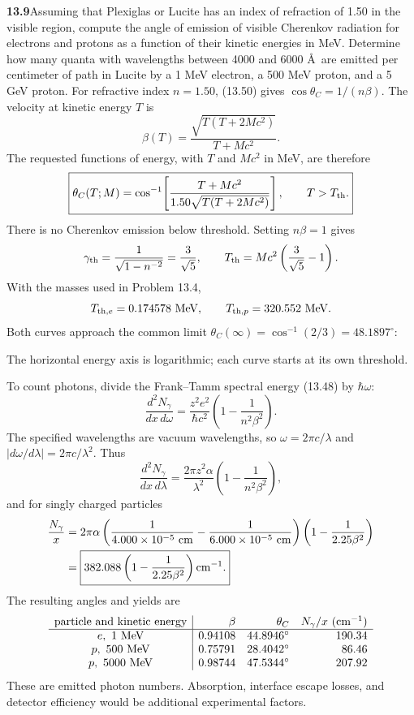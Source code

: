 \par\bigskip
\noindent\textbf{13.9}\quad Assuming that Plexiglas or Lucite has an index of refraction of 1.50 in the visible region, compute the angle of emission of visible Cherenkov radiation for electrons and protons as a function of their kinetic energies in MeV. Determine how many quanta with wavelengths between 4000 and 6000 \AA\ are emitted per centimeter of path in Lucite by a 1 MeV electron, a 500 MeV proton, and a 5 GeV proton.
\solution
For refractive index $n=1.50$, (13.50) gives
$\cos\theta_C=1/(n\beta)$. The velocity at kinetic energy $T$ is
\[
 \beta(T)=\frac{\sqrt{T(T+2Mc^2)}}{T+Mc^2}.
\]
The requested functions of energy, with $T$ and $Mc^2$ in MeV, are
therefore
\[
 \boxed{\theta_C(T;M)=
 \cos^{-1}\!\left[
 \frac{T+Mc^2}{1.50\sqrt{T(T+2Mc^2)}}\right],\qquad T>T_{\rm th}.}
\]
There is no Cherenkov emission below threshold. Setting $n\beta=1$
gives
\[
 \gamma_{\rm th}=\frac1{\sqrt{1-n^{-2}}}=\frac3{\sqrt5},
 \qquad
 T_{\rm th}=Mc^2\left(\frac3{\sqrt5}-1\right).
\]
With the masses used in Problem 13.4,
\[
 T_{{\rm th},e}=0.174578\ {\rm MeV},\qquad
 T_{{\rm th},p}=320.552\ {\rm MeV}.
\]
Both curves approach the common limit
$\theta_C(\infty)=\cos^{-1}(2/3)=48.1897^\circ$:
\begin{center}

\end{center}
The horizontal energy axis is logarithmic; each curve starts at its own
threshold.

To count photons, divide the Frank--Tamm spectral energy (13.48) by
$\hbar\omega$:
\[
 \frac{d^2N_\gamma}{dx\,d\omega}
 =\frac{z^2e^2}{\hbar c^2}
  \left(1-\frac1{n^2\beta^2}\right).
\]
The specified wavelengths are vacuum wavelengths, so
$\omega=2\pi c/\lambda$ and
$|d\omega/d\lambda|=2\pi c/\lambda^2$. Thus
\[
 \frac{d^2N_\gamma}{dx\,d\lambda}
 =\frac{2\pi z^2\alpha}{\lambda^2}
  \left(1-\frac1{n^2\beta^2}\right),
\]
and for singly charged particles
\[
 \begin{split}
 \frac{N_\gamma}{x}
 &=2\pi\alpha
 \left(\frac1{4.000\times10^{-5}\ {\rm cm}}
      -\frac1{6.000\times10^{-5}\ {\rm cm}}\right)
 \left(1-\frac1{2.25\beta^2}\right)\\
 &=\boxed{382.088\left(1-\frac1{2.25\beta^2}\right){\rm cm^{-1}}.}
 \end{split}
\]
The resulting angles and yields are
\[
\begin{array}{c|rrr}
 \text{particle and kinetic energy}&\beta&\theta_C&
 N_\gamma/x\ ({\rm cm^{-1}})\\ \hline
 e,\ 1\ {\rm MeV}&0.94108&44.8946^\circ&190.34\\
 p,\ 500\ {\rm MeV}&0.75791&28.4042^\circ&86.46\\
 p,\ 5000\ {\rm MeV}&0.98744&47.5344^\circ&207.92
\end{array}
\]
These are emitted photon numbers. Absorption, interface escape losses,
and detector efficiency would be additional experimental factors.





